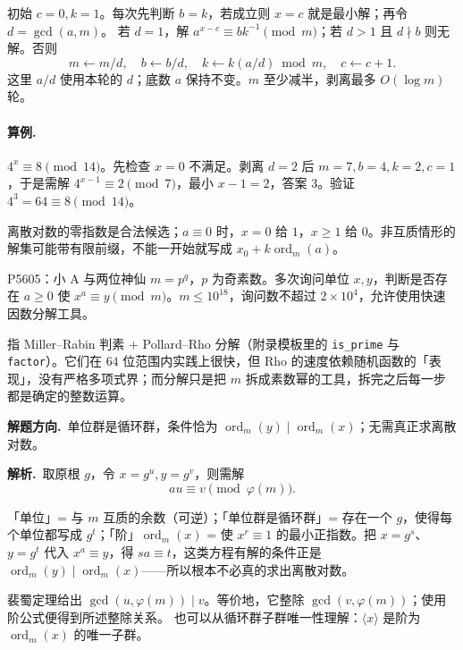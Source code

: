\documentclass[UTF8,a4paper,11pt,oneside,openany,fontset=fandol]{ctexbook}
\theoremstyle{definition}
\newcommand{\ord}{\operatorname{ord}}
\newcommand{\sol}{\par\noindent\textbf{解析.}\ }
\newcommand{\hint}{\par\noindent\textbf{解题方向.}\ }
\begin{document}
初始 $c=0,k=1$。每次先判断 $b=k$，若成立则 $x=c$ 就是最小解；再令 $d=\gcd(a,m)$。
若 $d=1$，解 $a^{x-c}\equiv bk^{-1}\pmod m$；若 $d>1$ 且 $d\nmid b$ 则无解。否则
\[
 m\gets m/d,\quad b\gets b/d,\quad
 k\gets k(a/d)\bmod m,\quad c\gets c+1.
\]
这里 $a/d$ 使用本轮的 $d$；底数 $a$ 保持不变。$m$ 至少减半，剥离最多 $O(\log m)$ 轮。

\paragraph{算例.} $4^x\equiv8\pmod{14}$。先检查 $x=0$ 不满足。剥离 $d=2$ 后 $m=7,b=4,k=2,c=1$，于是需解 $4^{x-1}\equiv2\pmod7$，最小 $x-1=2$，答案 $3$。验证 $4^3=64\equiv8\pmod{14}$。
\begin{pitfall}
离散对数的零指数是合法候选；$a\equiv0$ 时，$x=0$ 给 $1$，$x\ge1$ 给 $0$。非互质情形的解集可能带有限前缀，不能一开始就写成 $x_0+k\ord_m(a)$。
\end{pitfall}


\begin{problem}{P5605：小 A 与两位神仙}
$m=p^q$，$p$ 为奇素数。多次询问单位 $x,y$，判断是否存在 $a\ge0$ 使 $x^a\equiv y\pmod m$。$m\le10^{18}$，询问数不超过 $2\times10^4$，允许使用快速因数分解工具。
\end{problem}

\begin{tip}
指 Miller--Rabin 判素 + Pollard--Rho 分解（附录模板里的 \texttt{is\_prime} 与 \texttt{factor}）。它们在 $64$ 位范围内实践上很快，但 Rho 的速度依赖随机函数的「表现」，没有严格多项式界；而分解只是把 $m$ 拆成素数幂的工具，拆完之后每一步都是确定的整数运算。
\end{tip}

\hint 单位群是循环群，条件恰为 $\ord_m(y)\mid\ord_m(x)$；无需真正求离散对数。

\sol 取原根 $g$，令 $x=g^u,y=g^v$，则需解
\[
 au\equiv v\pmod{\varphi(m)}.
\]

\begin{tip}[这条提示里的每个词]
「单位」= 与 $m$ 互质的余数（可逆）；「单位群是循环群」= 存在一个 $g$，使得每个单位都写成 $g^t$；「阶」$\ord_m(x)$ = 使 $x^r\equiv1$ 的最小正指数。把 $x=g^s$、$y=g^t$ 代入 $x^a\equiv y$，得 $sa\equiv t$，这类方程有解的条件正是 $\ord_m(y)\mid\ord_m(x)$——所以根本不必真的求出离散对数。
\end{tip}

裴蜀定理给出 $\gcd(u,\varphi(m))\mid v$。等价地，它整除 $\gcd(v,\varphi(m))$；使用阶公式便得到所述整除关系。
也可以从循环群子群唯一性理解：$\langle x\rangle$ 是阶为 $\ord_m(x)$ 的唯一子群。
\end{document}
